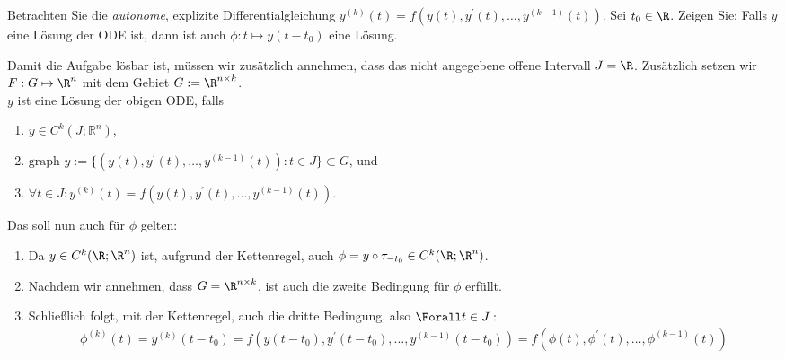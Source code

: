 \begin{exercise}

Betrachten Sie die \textit{autonome}, explizite Differentialgleichung $y^{(k)}(t) = f(y(t), y^\prime(t), \ldots, y^{(k-1)}(t))$.
Sei $t_0 \in \R$.
Zeigen Sie:
Falls $y$ eine Lösung der ODE ist, dann ist auch $\phi: t \mapsto y(t - t_0)$ eine Lösung.

\end{exercise}

\begin{solution}

Damit die Aufgabe lösbar ist, müssen wir zusätzlich annehmen, dass das nicht angegebene offene Intervall $J = \R$.
Zusätzlich setzen wir $F: G \mapsto \R^n$ mit dem Gebiet $G := \R^{n \times k}$. \\

$y$ ist eine Lösung der obigen ODE, falls

\begin{enumerate}[label = (\roman*)]

  \item $y \in C^k(J;\mathbb{R}^n)$,

  \item $\text{graph~} y := \{(y(t), y^\prime(t), \ldots, y^{(k-1)}(t)): t \in J\} \subset G$, und

  \item $\forall t \in J: y^{(k)}(t) = f(y(t), y^\prime(t), \ldots, y^{(k-1)}(t))$.

\end{enumerate}

Das soll nun auch für $\phi$ gelten:

\begin{enumerate}[label = (\roman*)]

  \item
  Da $y \in C^k(\R; \R^n)$ ist, aufgrund der Kettenregel, auch $\phi = y \circ \tau_{-t_0} \in C^k(\R; \R^n)$.

  \item
  Nachdem wir annehmen, dass $G = \R^{n \times k}$, ist auch die zweite Bedingung für $\phi$ erfüllt.

  \item
  Schließlich folgt, mit der Kettenregel, auch die dritte Bedingung, also $\Forall t \in J:$
  \begin{align*}
    \phi^{(k)}(t)
    =
    y^{(k)}(t-t_0)
    =
    f(y(t- t_0), y^\prime(t - t_0), \ldots, y^{(k-1)}(t-t_0))
    =
    f(\phi(t), \phi^\prime(t), \ldots, \phi^{(k-1)}(t))
  \end{align*}

\end{enumerate}


\end{solution}
